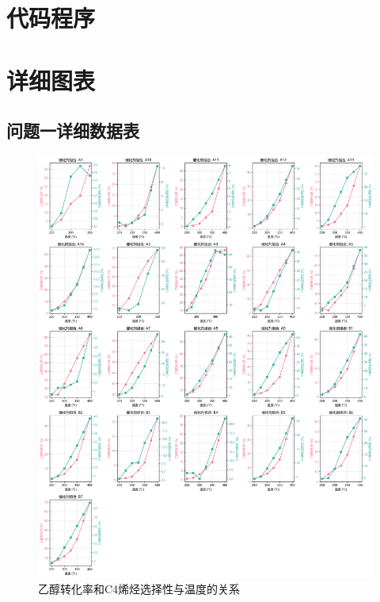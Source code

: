 \newpage
\appendix

\section{代码程序}







\section{详细图表}

\setcounter{figure}{0}
\setcounter{table}{0}

\subsection*{问题一详细数据表}

\begin{figure}[h]%
	\centering%
	\includegraphics [scale=0.4]{图/1-1-1.png}
	\caption{乙醇转化率和C4烯烃选择性与温度的关系} 
	\label{fig:1}
\end{figure}

